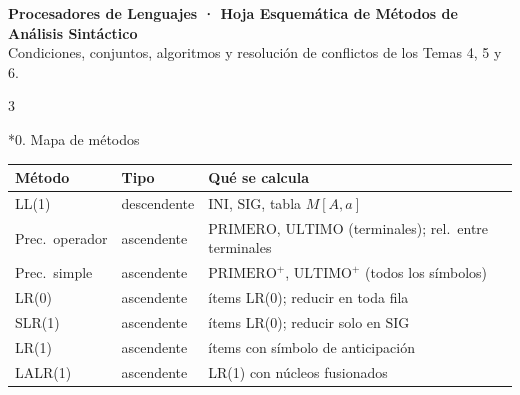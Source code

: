 \begin{landscape}
\thispagestyle{empty}
\begingroup
\fontsize{8.2pt}{9.6pt}\selectfont
\setlength{\parindent}{0pt}
\setlength{\parskip}{1.5pt}
\setlength{\columnsep}{0.4cm}
\setlength{\columnseprule}{0.35pt}
\setlength{\tabcolsep}{2.5pt}
\renewcommand{\arraystretch}{1.05}
\setlength{\abovedisplayskip}{3pt}
\setlength{\belowdisplayskip}{3pt}
\setlength{\abovedisplayshortskip}{2pt}
\setlength{\belowdisplayshortskip}{2pt}
\let\olditemize\itemize
\def\itemize{\olditemize\setlength{\itemsep}{0.5pt}\setlength{\parskip}{0pt}\setlength{\topsep}{1.5pt}\setlength{\partopsep}{0pt}}
\let\oldenumerate\enumerate
\def\enumerate{\oldenumerate\setlength{\itemsep}{0.5pt}\setlength{\parskip}{0pt}\setlength{\topsep}{1.5pt}\setlength{\partopsep}{0pt}}
\newcommand{\hsec}[1]{\par\vspace{4pt}\noindent{\fontsize{9.4pt}{11pt}\bfseries #1}\par\vspace{2pt}}
\makeatletter
\renewcommand{\subsection}{\@ifstar\hsec\hsec}
\makeatother

\begin{center}
{\large\bfseries Procesadores de Lenguajes · Hoja Esquemática de Métodos de Análisis Sintáctico}\\[1pt]
{\scriptsize Condiciones, conjuntos, algoritmos y resolución de conflictos de los Temas 4, 5 y 6.}
\end{center}
\vspace{-4pt}

\begin{multicols*}{3}

\subsection*{0. Mapa de métodos}
\begin{tabular}{@{}llp{4.3cm}@{}}
\toprule
\textbf{Método} & \textbf{Tipo} & \textbf{Qué se calcula}\\
\midrule
LL(1) & descendente & $\mathrm{INI}$, $\mathrm{SIG}$, tabla $M[A,a]$\\
Prec.\ operador & ascendente & $\mathrm{PRIMERO}$, $\mathrm{ULTIMO}$ (terminales); rel.\ entre terminales\\
Prec.\ simple & ascendente & $\mathrm{PRIMERO}^+$, $\mathrm{ULTIMO}^+$ (todos los símbolos)\\
LR(0) & ascendente & ítems LR(0); reducir en toda fila\\
SLR(1) & ascendente & ítems LR(0); reducir solo en $\mathrm{SIG}$\\
LR(1) & ascendente & ítems con símbolo de anticipación\\
LALR(1) & ascendente & LR(1) con núcleos fusionados\\
\bottomrule
\end{tabular}


\end{multicols*}
\end{landscape}
